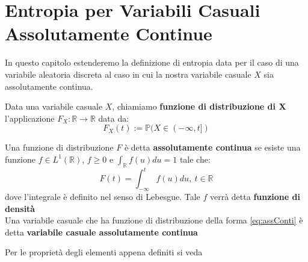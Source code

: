 \chapter{Entropia per Variabili Casuali Assolutamente Continue}
In questo capitolo estenderemo la definizione di entropia data per il caso di una variabile aleatoria discreta al caso in cui la nostra variabile casuale $X$ sia assolutamente continua.

\begin{defi}
Data una variabile casuale $X$, chiamiamo \textbf{funzione di distribuzione di X} l'applicazione $F_X: \mathbb{R} \to \mathbb{R}$ data da:
$$F_X(t):= \mathbb{P}(X \in (-\infty,t])$$
\end{defi}
\begin{defi}
Una funzione di distribuzione $F$ è detta \textbf{assolutamente continua} se esiste una funzione $f \in L^1(\mathbb{R})$, $f\geq 0$ e $\int_{\mathbb{R}} f(u)du=1$ tale che:
\begin{equation}\label{eq:assConti}
F(t)=\int_{-\infty }^t f(u)du, \  t\in \mathbb{R}
\end{equation}
dove l'integrale è definito nel senso di Lebesgue. Tale $f$ verrà detta \textbf{funzione di densità}\\
Una variabile casuale che ha funzione di distribuzione della forma \ref{eq:assConti} è detta \textbf{variabile casuale assolutamente continua}
\end{defi}
Per le proprietà degli elementi appena definiti si veda \cite{Mazzucchi}

